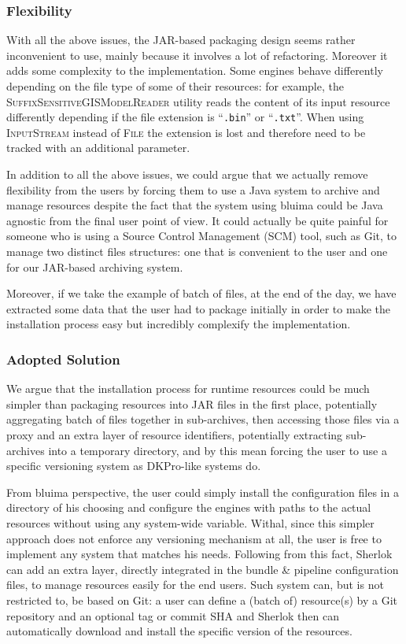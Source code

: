 \documentclass{article}
\newcommand{\ID}[1]{{\textsc{#1}}}
\newcommand{\PATH}[1]{\mbox{\texttt{#1}}}
\newcommand{\JAR}{JAR\xspace}
\begin{document}
\subsubsection{Flexibility}

With all the above issues, the \JAR-based packaging design seems rather inconvenient to use, mainly
because it involves a lot of refactoring. Moreover it adds some complexity to the implementation.
Some engines behave differently depending on the file type of some of their resources: for example,
the \ID{SuffixSensitiveGISModelReader} utility reads the content of its input resource differently
depending if the file extension is ``\PATH{.bin}'' or ``\PATH{.txt}''. When using \ID{InputStream}
instead of \ID{File} the extension is lost and therefore need to be tracked with an additional
parameter.

In addition to all the above issues, we could argue that we actually remove flexibility from the
users by forcing them to use a Java system to archive and manage resources despite the fact that the
system using bluima could be Java agnostic from the final user point of view. It could actually be
quite painful for someone who is using a Source Control Management (SCM) tool, such as Git, to
manage two distinct files structures: one that is convenient to the user and one for our \JAR-based
archiving system.

Moreover, if we take the example of batch of files, at the end of the day, we have extracted some
data that the user had to package initially in order to make the installation process easy but
incredibly complexify the implementation.


\subsubsection{Adopted Solution}

We argue that the installation process for runtime resources could be much simpler than packaging
resources into \JAR files in the first place, potentially aggregating batch of files together in
sub-archives, then accessing those files via a proxy and an extra layer of resource identifiers,
potentially extracting sub-archives into a temporary directory, and by this mean forcing the user to
use a specific versioning system as DKPro-like systems do.

From bluima perspective, the user could simply install the configuration files in a directory of his
choosing and configure the engines with paths to the actual resources without using any system-wide
variable. Withal, since this simpler approach does not enforce any versioning mechanism at all, the
user is free to implement any system that matches his needs. Following from this fact, Sherlok can
add an extra layer, directly integrated in the bundle \& pipeline configuration files, to manage
resources easily for the end users. Such system can, but is not restricted to, be based on Git: a
user can define a (batch of) resource(s) by a Git repository and an optional tag or commit SHA and
Sherlok then can automatically download and install the specific version of the resources.
\end{document}
